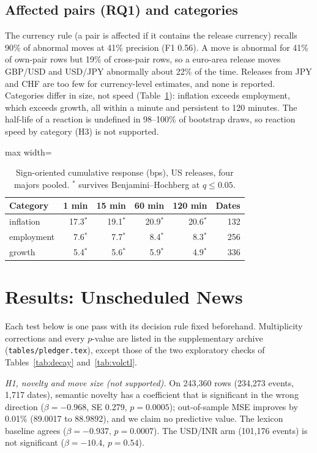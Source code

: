 \documentclass[conference]{IEEEtran}
\begin{document}
\subsection{Affected pairs (RQ1) and categories}
The currency rule (a pair is affected if it contains the release currency) recalls 90\% of
abnormal moves at 41\% precision (F1 0.56). A move is abnormal for 41\% of own-pair rows but
19\% of cross-pair rows, so a euro-area release moves GBP/USD and USD/JPY abnormally about 22\%
of the time. Releases from JPY and CHF are too few for currency-level estimates, and none is
reported. Categories differ in size, not speed (Table~\ref{tab:h2}): inflation exceeds
employment, which exceeds growth, all within a minute and persistent to 120 minutes. The
half-life of a reaction is undefined in 98--100\% of bootstrap draws, so reaction speed by
category (H3) is not supported.

\begin{table}[t]\centering\footnotesize
\caption{Sign-oriented cumulative response (bps), US releases, four majors pooled. $^{*}$
survives Benjamini--Hochberg at $q\le0.05$.}\label{tab:h2}
\begin{adjustbox}{max width=\columnwidth}
\begin{tabular}{@{}lrrrrr@{}}
\toprule
Category & 1 min & 15 min & 60 min & 120 min & Dates\\
\midrule
inflation & 17.3$^{*}$ & 19.1$^{*}$ & 20.9$^{*}$ & 20.6$^{*}$ & 132\\
employment & 7.6$^{*}$ & 7.7$^{*}$ & 8.4$^{*}$ & 8.3$^{*}$ & 256\\
growth & 5.4$^{*}$ & 5.6$^{*}$ & 5.9$^{*}$ & 4.9$^{*}$ & 336\\
\bottomrule
\end{tabular}
\end{adjustbox}
\end{table}

\section{Results: Unscheduled News}\label{sec:unsched}
Each test below is one pass with its decision rule fixed beforehand. Multiplicity corrections and
every $p$-value are listed in the supplementary archive (\texttt{tables/pledger.tex}), except those
of the two exploratory checks of Tables~\ref{tab:decay} and~\ref{tab:volctl}.

\emph{H1, novelty and move size (not supported).} On 243,360 rows (234,273 events, 1,717 dates),
semantic novelty has a coefficient that is significant in the wrong direction ($\beta=-0.968$, SE
0.279, $p=0.0005$); out-of-sample MSE improves by 0.01\% (89.0017 to 88.9892), and we claim no
predictive value. The lexicon baseline agrees ($\beta=-0.937$, $p=0.0007$). The USD/INR arm
(101,176 events) is not significant ($\beta=-10.4$, $p=0.54$).
\end{document}
